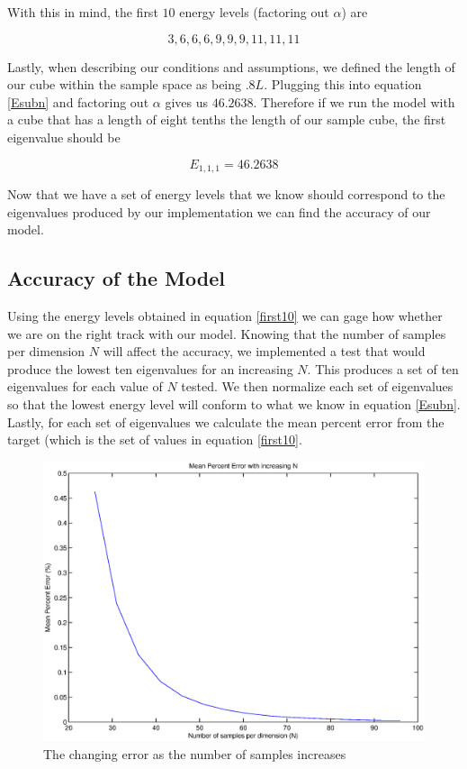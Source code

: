 \documentclass[authoryearcitations]{UoYCSproject}
\begin{document}
With this in mind, the first $10$ energy levels (factoring out $\alpha$) are

\begin{equation}
3, 6, 6, 6, 9, 9, 9, 11, 11, 11
\label{first10}
\end{equation}

Lastly, when describing our conditions and assumptions, we defined the length of our cube within the sample
space as being $.8L$. Plugging this into equation \ref{Esubn} and factoring out $\alpha$ gives us $46.2638$. 
Therefore if we run the model with a cube that has a length of eight tenths the length of our sample cube, 
the first eigenvalue should be 

\begin{equation}
E_{1,1,1} = 46.2638 
\label{lowestVal}
\end{equation}

Now that we have a set of energy levels that we know should correspond to the eigenvalues produced by our implementation
we can find the accuracy of our model. 

\subsection{Accuracy of the Model}
Using the energy levels obtained in equation \ref{first10} we can gage how whether we are on the right track with our model.
Knowing that the number of samples per dimension $N$ will affect the accuracy, we implemented a test that would produce
the lowest ten eigenvalues for an increasing $N$. This produces a set of ten eigenvalues for each value of $N$ tested. 
We then normalize each set of eigenvalues so that the lowest energy level will
conform to what we know in equation \ref{Esubn}. Lastly, for each set of eigenvalues we calculate the mean percent error
from the target (which is the set of values in equation \ref{first10}.

\begin{figure}
\centering
\includegraphics[scale=0.4]{figures/meanPercentError.eps}
\caption{The changing error as the number of samples increases}
\label{errorPlot}
\end{figure}
\end{document}
